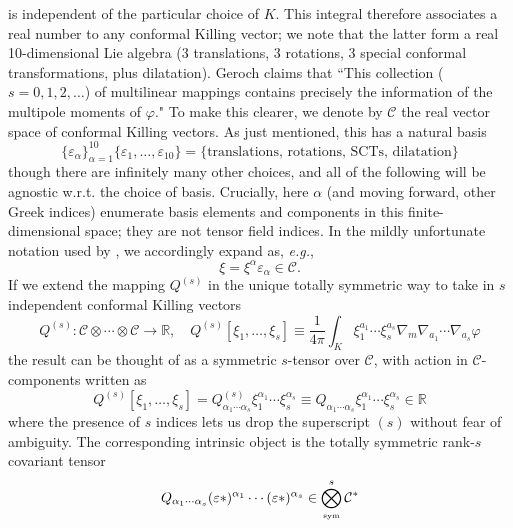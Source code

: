 \documentclass[11pt,letterpaper]{article}
\newcommand{\mc}[1]{\mathcal{#1}}
\newcommand{\R}{\mathbb{R}}
\begin{document}
is independent of the particular choice of $K$. This integral therefore associates a real number to any conformal Killing vector; we note that the latter form a real 10-dimensional Lie algebra (3 translations, 3 rotations, 3 special conformal transformations, plus dilatation). Geroch \cite{Geroch:1970cc} claims that ``This collection ($s = 0, 1,2, \ldots$) of multilinear
mappings contains precisely the information of the multipole moments of $\varphi$." To make this clearer, we denote by $\mc{C}$ the real vector space of conformal Killing vectors. As just mentioned, this has a natural basis \begin{equation}
\{\varepsilon_\alpha\}_{\alpha = 1}^{10} \{\varepsilon_1, \ldots, \varepsilon_{10} \} = \{\mbox{translations, rotations, SCTs, dilatation}\}
\end{equation}
though there are infinitely many other choices, and all of the following will be agnostic w.r.t. the choice of basis. Crucially, here $\alpha$ (and moving forward, other Greek indices) enumerate basis elements and components in this finite-dimensional space; they are not tensor field indices. In the mildly unfortunate notation used by \cite{Geroch:1970cc}, we accordingly expand as, \textit{e.g.}, \begin{equation}
\xi = \xi^\alpha \varepsilon_\alpha \in \mc{C}.
\end{equation}
If we extend the mapping $Q^{(s)}$ in the unique totally symmetric way to take in $s$ independent conformal Killing vectors \begin{equation}
Q^{(s)}: \mc{C} \otimes \cdots \otimes \mc{C} \to \R, \quad Q^{(s)}[\xi_1, \ldots, \xi_s] \equiv \frac{1}{4 \pi} \int_K \xi_1^{a_1} \cdots \xi_s^{a_s} \nabla_m \nabla_{a_1} \cdots \nabla_{a_s} \varphi
\end{equation}
the result can be thought of as a symmetric $s$-tensor over $\mc{C}$, with action in $\mc{C}$-components written as \begin{equation}
Q^{(s)}[\xi_1, \ldots, \xi_s] = Q^{(s)}_{\alpha_1 \cdots \alpha_s} \xi_1^{\alpha_1} \cdots \xi_s^{\alpha_s} \equiv Q_{\alpha_1 \cdots \alpha_s} \xi_1^{\alpha_1} \cdots \xi_s^{\alpha_s} \in \R
\end{equation}
where the presence of $s$ indices lets us drop the superscript $(s)$ without fear of ambiguity. The corresponding intrinsic object is the totally symmetric rank-$s$ covariant tensor \begin{equation}
Q_{\alpha_1 \cdots \alpha_s} (\varepsilon*)^{\alpha_1} \cdots (\varepsilon*)^{\alpha_s} \in \bigotimes^s_{\mbox{\tiny{sym}}} \mc{C}^* 
\end{equation}
\end{document}
